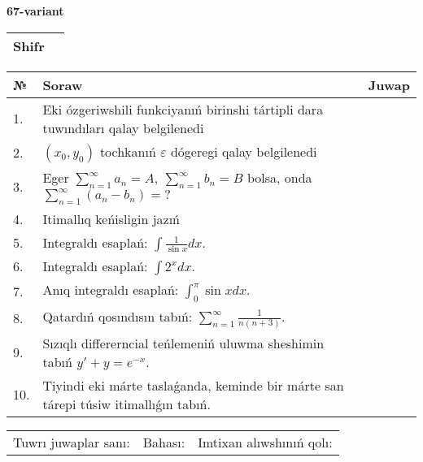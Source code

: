 \documentclass{article}
\begin{document}
  \egroup
  
  \newpage
  
  
  \textbf{67-variant}\\
  
  \bgroup
  \def\arraystretch{1.6} %
  
  \begin{tabular}{|m{5.7cm}|m{9.5cm}|}
  \hline
  Shifr & \\
  \hline
  \end{tabular}
  
  \vspace{1cm}
  
  \begin{tabular}{|m{0.7cm}|m{10cm}|m{4cm}|}
  \hline
  № & Soraw & Juwap \\
  \hline
  1. & Eki ózgeriwshili funkciyanıń birinshi tártipli dara tuwındıları qalay belgilenedi &  \\
  \hline
  2. & \((x_0,y_0)\) tochkanıń \(\varepsilon\) dógeregi qalay belgilenedi &  \\
  \hline
  3. & Eger \(\sum_{n = 1}^{\infty}a_{n} = A,\ \sum_{n = 1}^{\infty}b_{n} = B\) bolsa, onda \(\sum_{n = 1}^{\infty}\left( a_{n} - b_{n} \right) = ?\) &  \\
  \hline
  4. & Itimallıq keńisligin jazıń &  \\
  \hline
  5. & Integraldı esaplań: \(\int{\frac{1}{\sin x}dx}\). &  \\
  \hline
  6. & Integraldı esaplań: \(\int{2^{x}dx}\). &  \\
  \hline
  7. & Anıq integraldı esaplań: \(\int_{0}^{\pi}{\sin xdx}\). &  \\
  \hline
  8. & Qatardıń qosındısın tabıń: \(\sum_{n = 1}^{\infty}\frac{1}{n(n + 3)}\). &  \\
  \hline
  9. & Sızıqlı differerncial teńlemeniń uluwma sheshimin tabıń \(y' + y = e^{- x}\). &  \\
  \hline
  10. & Tiyindi eki márte taslaǵanda, keminde bir márte san tárepi túsiw itimallıǵın tabıń. &  \\
  \hline
  \end{tabular}
  
  \vspace{1cm}
  
  \begin{tabular}{lll}
  Tuwrı juwaplar sanı: \underline{\hspace{1.5cm}} & 
  Bahası: \underline{\hspace{1.5cm}} & 
  Imtixan alıwshınıń qolı: \underline{\hspace{2cm}} \\
  \end{tabular}
  
\end{document}
